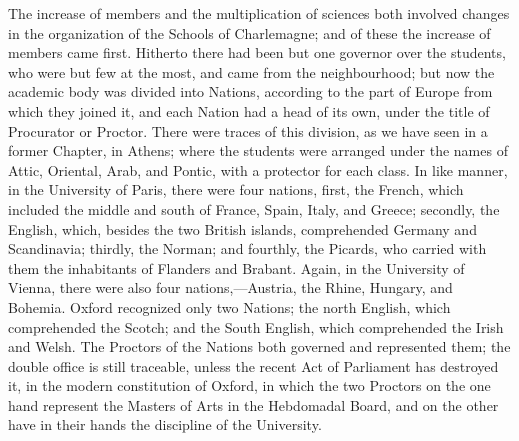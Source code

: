 The increase of members and
the multiplication of sciences both involved changes in the
organization of the Schools of Charlemagne; and of these the increase
of members came first. Hitherto there had been but one governor over
the students, who were but few at the most, and came from the
neighbourhood; but now the academic body was divided into Nations,
according to the part of Europe from which they joined it, and each
Nation had a head of its own, under the title of Procurator or
Proctor. There were traces of this division, as we have seen in a
former Chapter, in Athens; where the students were arranged under the
names of Attic, Oriental, Arab, and Pontic, with a protector for each
class. In like manner, in the University of Paris, there were four
nations, first, the French, which included the middle and south of
France, Spain, Italy, and Greece; secondly, the English, which,
besides the two British islands, comprehended Germany and Scandinavia;
thirdly, the Norman; and fourthly, the Picards, who carried with them
the inhabitants of Flanders and Brabant. Again, in the University of
Vienna, there were also four nations,—Austria, the Rhine, Hungary,
and Bohemia. Oxford recognized only two Nations; the north English,
which comprehended the Scotch; and the South English, which
comprehended the Irish and Welsh. The Proctors of the Nations both
governed and represented them; the double office is still traceable,
unless the recent Act of Parliament has destroyed it, in the modern
constitution of Oxford, in which the two Proctors on the one hand
represent the Masters of Arts in the Hebdomadal Board, and on
the other have in their hands the discipline of the University.

